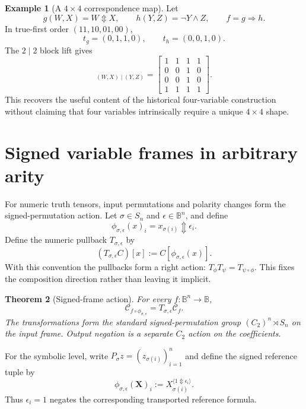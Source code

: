 \documentclass[11pt]{article}
\newtheorem{theorem}{Theorem}[section]
\theoremstyle{definition}
\newtheorem{example}[theorem]{Example}
\theoremstyle{remark}
\newcommand{\B}{\mathbb B}
\newcommand{\cC}{\mathcal C}
\newcommand{\xor}{\mathbin{\Updownarrow}}
\begin{document}
\begin{example}[A $4\times4$ correspondence map]
Let
\[
 g(W,X)=W\xor X,\qquad
 h(Y,Z)=\neg Y\land Z,\qquad
 f=g\Rightarrow h.
\]
In true-first order $(11,10,01,00)$,
\[
 t_g=(0,1,1,0),\qquad t_h=(0,0,1,0).
\]
The $2\mid2$ block lift gives
\begin{equation}
 [f]_{(W,X)\mid(Y,Z)}=
 \begin{bmatrix}
 1&1&1&1\\
 0&0&1&0\\
 0&0&1&0\\
 1&1&1&1
 \end{bmatrix}.
 \label{eq:fourbyfour}
\end{equation}
This recovers the useful content of the historical four-variable construction without claiming that four variables intrinsically require a unique $4\times4$ shape.
\end{example}

\section{Signed variable frames in arbitrary arity}
\label{sec:frames}

For numeric truth tensors, input permutations and polarity changes form the signed-permutation action.  Let $\sigma\in S_n$ and $\epsilon\in\B^n$, and define
\begin{equation}
 \phi_{\sigma,\epsilon}(x)_i=x_{\sigma(i)}\xor\epsilon_i.
 \label{eq:signedmap}
\end{equation}
Define the numeric pullback $T_{\sigma,\epsilon}$ by
\[
 (T_{\sigma,\epsilon}C)[x]:=C[\phi_{\sigma,\epsilon}(x)].
\]
With this convention the pullbacks form a right action: $T_{\phi}T_{\psi}=T_{\psi\circ\phi}$.  This fixes the composition direction rather than leaving it implicit.
\begin{theorem}[Signed-frame action]
For every $f:\B^n\to\B$,
\begin{equation}
 \cC_{f\circ\phi_{\sigma,\epsilon}}
 =T_{\sigma,\epsilon}\cC_f.
 \label{eq:signedaction}
\end{equation}
The transformations form the standard signed-permutation group $(C_2)^n\rtimes S_n$ on the input frame.  Output negation is a separate $C_2$ action on the coefficients.
\end{theorem}

For the symbolic level, write $P_\sigma z=(z_{\sigma(i)})_{i=1}^n$ and define the signed reference tuple by
\[
 \phi_{\sigma,\epsilon}(\mathbf X)_i
 :=X_{\sigma(i)}^{\langle 1\xor\epsilon_i\rangle}.
\]
Thus $\epsilon_i=1$ negates the corresponding transported reference formula.
\end{document}
